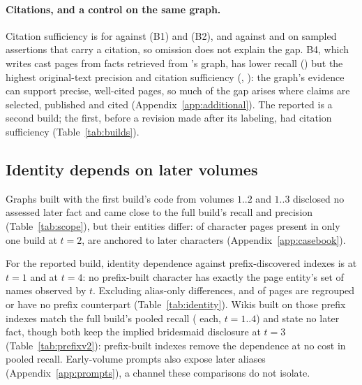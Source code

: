 \paragraph{Citations, and a control on the same graph.}
Citation sufficiency is  for \sys against 
(B1) and  (B2), and  against  and
 on sampled assertions that carry a citation, so omission does not
explain the gap. B4, which writes cast pages from facts retrieved from \sys's graph, has
lower recall () but the highest original-text precision and citation
sufficiency (, ): the graph's evidence can
support precise, well-cited pages, so much of the gap arises where claims are selected,
published and cited (Appendix~\ref{app:additional}). The
reported \sys is a second build; the first, before a revision made after its labeling,
had citation sufficiency  (Table~\ref{tab:builds}).

\subsection{Identity depends on later volumes}
\label{sec:results-scope}
Graphs built with the first build's code from volumes $1..2$ and $1..3$ disclosed no
assessed later fact and came close to the full build's recall and precision
(Table~\ref{tab:scope}), but their entities differ: of  character
pages present in only one build at $t=2$,  are anchored to later
characters (Appendix~\ref{app:casebook}).

For the reported build, identity dependence against prefix-discovered indexes is
 at $t=1$ and  at $t=4$: no prefix-built
character has exactly the page entity's set of names observed by $t$. Excluding
alias-only differences,  and  of pages
are regrouped or have no prefix counterpart (Table~\ref{tab:identity}). Wikis built on
those prefix indexes match the full build's pooled recall ( each,
$t=1..4$) and state no later fact, though both keep the implied bridesmaid disclosure at
$t=3$ (Table~\ref{tab:prefixv2}): prefix-built indexes remove the dependence at no cost in
pooled recall. Early-volume prompts also expose later aliases
(Appendix~\ref{app:prompts}), a channel these comparisons do not isolate.
